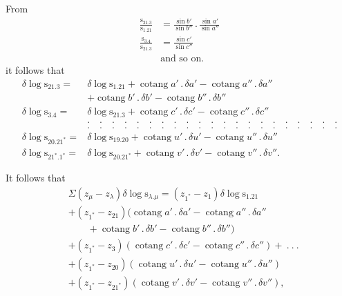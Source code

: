 \par\noindent\hspace*{\parindent}From
\[
\begin{aligned}
\frac{\mathrm{s}_{21.3}}{\mathrm{s}_{1.21}}&=\frac{\sin b'}{\sin b''}\,.\,\frac{\sin a'}{\sin a''}\\[7pt]
\frac{\mathrm{s}_{3.4}}{\mathrm{s}_{21.3}}&=\frac{\sin c'}{\sin c''}\\[5pt]
&\text{and so on.}
\end{aligned}
\]
\noindent it follows that
\[
\begin{aligned}
\delta\log\mathrm{s}_{21.3}={}&\delta\log\mathrm{s}_{1.21}+\operatorname{cotang}a'\,.\,\delta a'-\operatorname{cotang}a''\,.\,\delta a''\\
&+\operatorname{cotang}b'\,.\,\delta b'-\operatorname{cotang}b''\,.\,\delta b''\\
\delta\log\mathrm{s}_{3.4}={}&\delta\log\mathrm{s}_{21.3}+\operatorname{cotang}c'\,.\,\delta c'-\operatorname{cotang}c''\,.\,\delta c''\\
&.\quad.\quad.\quad.\quad.\quad.\quad.\quad.\quad.\quad.\quad.\quad.\quad.\quad.\quad.\quad.\quad.\quad.\quad.\quad.\quad.\\
&.\quad.\quad.\quad.\quad.\quad.\quad.\quad.\quad.\quad.\quad.\quad.\quad.\quad.\quad.\quad.\quad.\quad.\quad.\quad.\quad.\\
\delta\log\mathrm{s}_{20.21^*}={}&\delta\log\mathrm{s}_{19.20}+\operatorname{cotang}u'\,.\,\delta u'-\operatorname{cotang}u''\,.\,\delta u''\\
\delta\log\mathrm{s}_{21^*.1^*}={}&\delta\log\mathrm{s}_{20.21^*}+\operatorname{cotang}v'\,.\,\delta v'-\operatorname{cotang}v''\,.\,\delta v''.
\end{aligned}
\]
\par\noindent\hspace*{\parindent}It follows that
\[
\begin{aligned}
&\Sigma(z_\mu-z_\lambda)\delta\log\mathrm{s}_{\lambda.\mu}=(z_{1^*}-z_1)\delta\log\mathrm{s}_{1.21}\\
&+(z_{1^*}-z_{21})\bigl(\operatorname{cotang}a'\,.\,\delta a'-\operatorname{cotang}a''\,.\,\delta a''\\
&\qquad+\operatorname{cotang}b'\,.\,\delta b'-\operatorname{cotang}b''\,.\,\delta b''\bigr)\\
&+(z_{1^*}-z_3)(\operatorname{cotang}c'\,.\,\delta c'-\operatorname{cotang}c''\,.\,\delta c'')+\ .\ .\ .\\
&+(z_{1^*}-z_{20})(\operatorname{cotang}u'\,.\,\delta u'-\operatorname{cotang}u''\,.\,\delta u'')\\
&+(z_{1^*}-z_{21^*})(\operatorname{cotang}v'\,.\,\delta v'-\operatorname{cotang}v''\,.\,\delta v''),
\end{aligned}
\]
